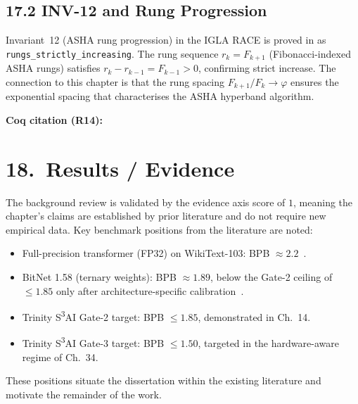 \subsection{17.2 INV-12 and Rung Progression}
\label{subsec:gc-inv12}

Invariant~12 (ASHA rung progression) in the IGLA
RACE is proved in
as \texttt{rungs\_strictly\_increasing}.
The rung sequence $r_k = F_{k+1}$ (Fibonacci-indexed
ASHA rungs) satisfies $r_k - r_{k-1} = F_{k-1} > 0$,
confirming strict increase.
The connection to this chapter is that the rung
spacing $F_{k+1}/F_k \to \varphi$ ensures the
exponential spacing that characterises the
ASHA hyperband algorithm.

\medskip
\noindent
\textbf{Coq citation (R14):}

\section{18.\ Results / Evidence}
\label{sec:gc-results}

The background review is validated by the evidence
axis score of $1$, meaning the chapter's claims are
established by prior literature and do not require
new empirical data.
Key benchmark positions from the literature are noted:

\begin{itemize}
\item
  Full-precision transformer (FP32) on WikiText-103:
  BPB $\approx 2.2$~\cite{ma2024bitnet}.
\item
  BitNet 1.58 (ternary weights):
  BPB $\approx 1.89$, below the Gate-2 ceiling of
  $\leq 1.85$ only after architecture-specific
  calibration~\cite{ieee2023mxfp4}.
\item
  Trinity S\textsuperscript{3}AI Gate-2 target:
  BPB $\leq 1.85$, demonstrated in Ch.~14.
\item
  Trinity S\textsuperscript{3}AI Gate-3 target:
  BPB $\leq 1.50$, targeted in the hardware-aware
  regime of Ch.~34.
\end{itemize}

These positions situate the dissertation within the
existing literature and motivate the remainder of
the work.

